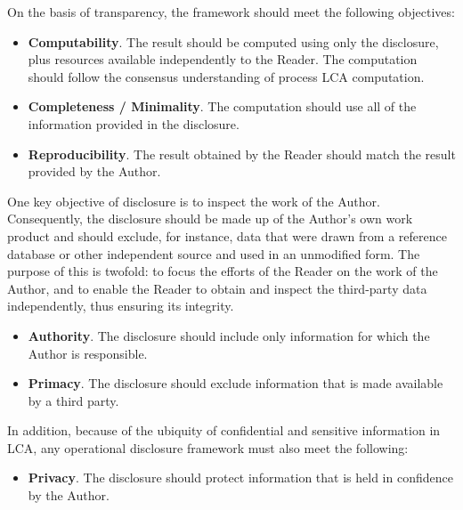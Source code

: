 On the basis of transparency, the framework should meet the following objectives:
\begin{itemize}
\item \textbf{Computability}. The result should be computed using only the disclosure, plus resources available independently to the Reader.  The computation should follow the consensus understanding of process LCA computation.
\item \textbf{Completeness / Minimality}.  The computation should use all of the information provided in the disclosure.
\item \textbf{Reproducibility}.  The result obtained by the Reader should match the result provided by the Author.
\end{itemize}
One key objective of disclosure is to inspect the work of the Author.  Consequently, the disclosure should be made up of the Author's own work product and should exclude, for instance, data that were drawn from a reference database or other independent source and used in an unmodified form.  The purpose of this is twofold: to focus the efforts of the Reader on the work of the Author, and to enable the Reader to obtain and inspect the third-party data independently, thus ensuring its integrity.
\begin{itemize}
\item \textbf{Authority}.  The disclosure should include only information for which the Author is responsible.
\item \textbf{Primacy}.  The disclosure should exclude information that is made available by a third party.
\end{itemize}
In addition, because of the ubiquity of confidential and sensitive information in LCA, any operational disclosure framework must also meet the following:
\begin{itemize}
\item \textbf{Privacy}.  The disclosure should protect information that is held in confidence by the Author.
\end{itemize}

\endinput


Let's say the author (whom we'll call Alice) wishes to make a disclosure to the reader (whom we'll call Rob) that would enable the reader to \emph{automatically} reproduce a given numerical result.  

The framework advanced in this paper aims to specify the contents of a \emph{minimal disclosure} by the author that would enable the reader to  reproduce 



